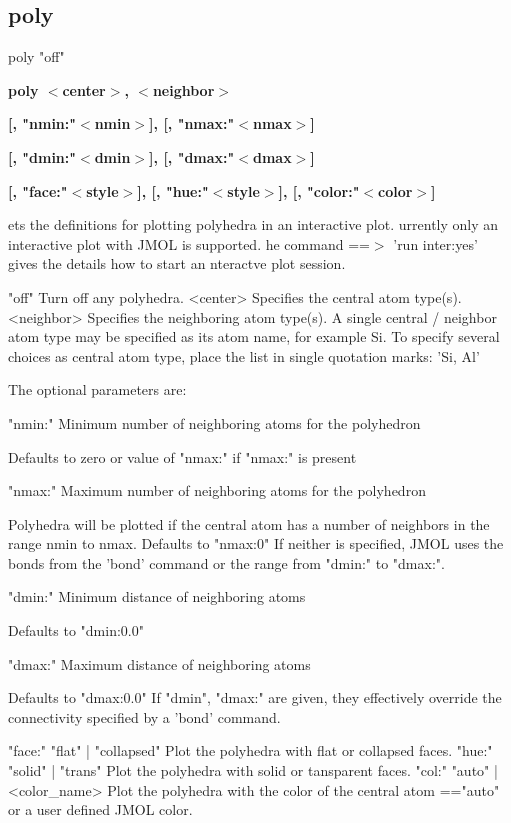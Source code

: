 \subsection*{poly}
\begin{MacVerbatim}
poly "off"
\end{MacVerbatim}
{\bf poly $ <$center$> $, $ <$neighbor$> $ \par }
{\bf      [, "nmin:"$ <$nmin$> $], [, "nmax:"$ <$nmax$> $] \par }
{\bf      [, "dmin:"$ <$dmin$> $], [, "dmax:"$ <$dmax$> $] \par }
{\bf      [, "face:"$ <$style$> $], [, "hue:"$ <$style$> $], [, "color:"$ <$color$> $] \par }
\par
\vspace{3pt}
ets the definitions for plotting polyhedra in an interactive plot. 
urrently only an interactive plot with JMOL is supported. 
he command ==$> $ 'run inter:yes' gives the details how to start an 
nteractve plot session. 
\par
\begin{MacVerbatim}
"off"      Turn off any polyhedra.
<center>   Specifies the central atom type(s).
<neighbor> Specifies the neighboring atom type(s).
         A single central / neighbor atom type may be specified
         as its atom name, for example Si.
         To specify several choices as central atom type, place
         the list in single quotation marks: 'Si, Al'
\end{MacVerbatim}
The optional parameters are: 
\par
\begin{MacVerbatim}
"nmin:"  Minimum number of neighboring atoms for the polyhedron
\end{MacVerbatim}
         Defaults to zero or value of "nmax:" if "nmax:" is present 
\begin{MacVerbatim}
"nmax:"  Maximum number of neighboring atoms for the polyhedron
\end{MacVerbatim}
         Polyhedra will be plotted if the central atom has a 
         number of neighbors in the range nmin to nmax. 
         Defaults to "nmax:0" 
         If neither is specified, JMOL uses the bonds from the 
         'bond' command or the range from "dmin:" to "dmax:". 
\begin{MacVerbatim}
"dmin:"  Minimum distance of neighboring atoms
\end{MacVerbatim}
         Defaults to "dmin:0.0" 
\begin{MacVerbatim}
"dmax:"  Maximum distance of neighboring atoms
\end{MacVerbatim}
         Defaults to "dmax:0.0" 
         If "dmin", "dmax:" are given, they effectively 
         override the connectivity specified by a 'bond' command. 
\begin{MacVerbatim}
"face:"  {"flat" | "collapsed"}
         Plot the polyhedra with flat or collapsed faces.
"hue:"   {"solid" | "trans"}
         Plot the polyhedra with solid or tansparent faces.
"col:"   {"auto" | <color_name>}
         Plot the polyhedra with the color of the central
         atom =="auto" or a user defined JMOL color.
\end{MacVerbatim}
